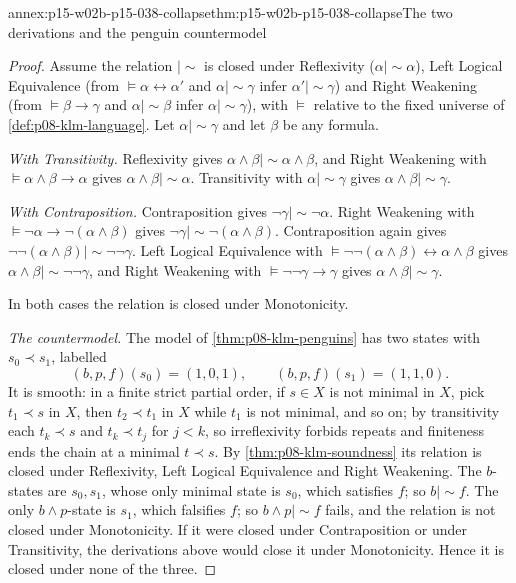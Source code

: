 \begin{annexitem}{annex:p15-w02b-p15-038-collapse}{thm:p15-w02b-p15-038-collapse}{The two derivations and the penguin countermodel}
\begin{proof}
Assume the relation \(\mathrel{|\!\sim}\) is closed under Reflexivity
(\(\alpha\mathrel{|\!\sim}\alpha\)), Left Logical Equivalence (from
\(\models\alpha\leftrightarrow\alpha'\) and
\(\alpha\mathrel{|\!\sim}\gamma\) infer
\(\alpha'\mathrel{|\!\sim}\gamma\)) and Right Weakening (from
\(\models\beta\to\gamma\) and \(\alpha\mathrel{|\!\sim}\beta\) infer
\(\alpha\mathrel{|\!\sim}\gamma\)), with \(\models\) relative to the
fixed universe of \cref{def:p08-klm-language}. Let
\(\alpha\mathrel{|\!\sim}\gamma\) and let \(\beta\) be any formula.

\emph{With Transitivity.} Reflexivity gives
\(\alpha\wedge\beta\mathrel{|\!\sim}\alpha\wedge\beta\), and Right
Weakening with \(\models\alpha\wedge\beta\to\alpha\) gives
\(\alpha\wedge\beta\mathrel{|\!\sim}\alpha\). Transitivity with
\(\alpha\mathrel{|\!\sim}\gamma\) gives
\(\alpha\wedge\beta\mathrel{|\!\sim}\gamma\).

\emph{With Contraposition.} Contraposition gives
\(\neg\gamma\mathrel{|\!\sim}\neg\alpha\). Right Weakening with
\(\models\neg\alpha\to\neg(\alpha\wedge\beta)\) gives
\(\neg\gamma\mathrel{|\!\sim}\neg(\alpha\wedge\beta)\).
Contraposition again gives
\(\neg\neg(\alpha\wedge\beta)\mathrel{|\!\sim}\neg\neg\gamma\).
Left Logical Equivalence with
\(\models\neg\neg(\alpha\wedge\beta)\leftrightarrow\alpha\wedge\beta\)
gives \(\alpha\wedge\beta\mathrel{|\!\sim}\neg\neg\gamma\), and Right
Weakening with \(\models\neg\neg\gamma\to\gamma\) gives
\(\alpha\wedge\beta\mathrel{|\!\sim}\gamma\).

In both cases the relation is closed under Monotonicity.

\emph{The countermodel.} The model of \cref{thm:p08-klm-penguins} has
two states with \(s_0\prec s_1\), labelled
\[
 (b,p,f)(s_0)=(1,0,1),\qquad(b,p,f)(s_1)=(1,1,0).
\]
It is smooth:
in a finite strict partial order, if \(s\in X\) is not minimal in \(X\),
pick \(t_1\prec s\) in \(X\), then \(t_2\prec t_1\) in \(X\) while
\(t_1\) is not minimal, and so on; by transitivity each \(t_k\prec s\)
and \(t_k\prec t_j\) for \(j<k\), so irreflexivity forbids repeats and
finiteness ends the chain at a minimal \(t\prec s\). By
\cref{thm:p08-klm-soundness} its relation is closed under Reflexivity,
Left Logical Equivalence and Right Weakening. The \(b\)-states are
\(s_0,s_1\), whose only minimal state is \(s_0\), which satisfies \(f\);
so \(b\mathrel{|\!\sim}f\). The only \(b\wedge p\)-state is \(s_1\),
which falsifies \(f\); so \(b\wedge p\mathrel{|\!\sim}f\) fails, and the
relation is not closed under Monotonicity. If it were closed under
Contraposition or under Transitivity, the derivations above would close
it under Monotonicity. Hence it is closed under none of the three.
\end{proof}
\end{annexitem}
